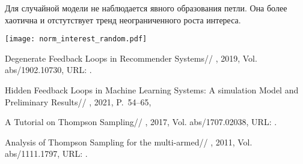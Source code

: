 \documentclass[12pt, twoside]{article}
\begin{document}
Для случайной модели не наблюдается явного образования петли. 
Она более хаотична и отстутствует тренд неограниченного роста интереса.   
\begin{center}
  \texttt{[image: norm\_interest\_random.pdf]}
\end{center}
\begin{thebibliography}{99}
    Degenerate Feedback Loops in Recommender Systems//
    , 2019, Vol. abs/1902.10730,
	  URL: .

    Hidden Feedback Loops in Machine Learning Systems: A simulation Model and Preliminary Results//
    , 2021, P.~54--65,

    A Tutorial on Thompson Sampling//
    , 2017, Vol. abs/1707.02038,
	  URL: .

    Analysis of Thompson Sampling for the multi-armed//
    , 2011, Vol. abs/1111.1797,
	  URL: .
\end{thebibliography}

\end{document}
